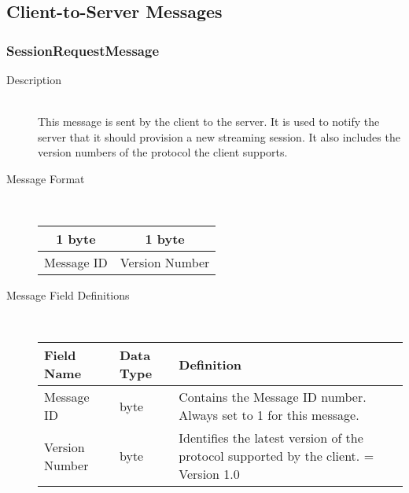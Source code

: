 \documentclass[12pt,letterpaper,titlepage]{article}
\begin{document}
\subsection{Client-to-Server Messages}
\subsubsection{SessionRequestMessage}
	\begin{description}
	\item[Description] \hfill \\
		This message is sent by the client to the server.  It is used to notify the server that it 
		should provision a new streaming session. It also includes the version numbers of the 
		protocol the client supports.
	\item[Message Format] \hfill \\
	\begin{tabular}{ | c | c | }
		\hline
		1 byte & 1 byte \\
		\hline
		Message ID &  Version Number \\
		\hline
	\end{tabular}
	\item[Message Field Definitions] \hfill \\
	\begin{tabular}{ | p{3cm} | p{1.5cm} | p{8cm} | }
		\hline
		Field Name & Data Type & Definition \\
		\hline
		Message ID & byte & Contains the Message ID number. \newline Always set to 1 for this message. \\
		\hline
		Version Number & byte & Identifies the latest version of the protocol supported by the client.
						\newline 1 = Version 1.0 \\
		\hline
	\end{tabular}
	\end{description}
\end{document}
